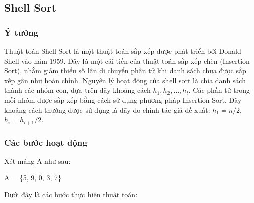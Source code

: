 \subsection{Shell Sort}

\subsubsection{Ý tưởng}
Thuật toán Shell Sort là một thuật toán sắp xếp được phát triển bởi Donald Shell vào năm 1959. Đây là một cải tiến của thuật toán sắp xếp chèn (Insertion Sort), nhằm giảm thiểu số lần di chuyển phần tử khi danh sách chưa được sắp xếp gần như hoàn chỉnh.
Nguyên lý hoạt động của shell sort là chia danh sách thành các nhóm con, dựa trên dãy khoảng cách $h_1, h_2, \dots, h_t$. Các phần tử trong mỗi nhóm được sắp xếp bằng cách sử dụng phương pháp Insertion Sort. Dãy khoảng cách thường được sử dụng là dãy do chính tác giả đề xuất: $h_1 = n / 2$, $h_i = h_{i + 1} / 2$.

\subsubsection{Các bước hoạt động}
Xét mảng A như sau: 
\begin{center}
   A = \{5, 9, 0, 3, 7\} 
\end{center} 
Dưới đây là các bước thực hiện thuật toán:

